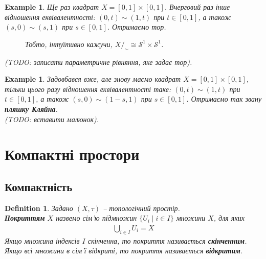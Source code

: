 \documentclass[a4paper, 10pt]{article}
\theoremstyle{theoremdd}
\newtheorem{definition}[theorem]{Definition}
\newtheorem{example}[theorem]{Example}
\begin{document}
\begin{example}
Ще раз квадрат $X = [0,1] \times [0,1]$. Вчерговий раз інше відношення еквівалентності: $(0,t) \sim (1,t)$ при $t \in [0,1]$, а також $(s,0) \sim (s,1)$ при $s \in [0,1]$. Отримаємо тор.
\begin{figure}[H]
\centering
{}
\qquad
{}
\caption*{Тобто, інтуїтивно кажучи, $X/_{\sim} \cong \mathcal{S}^1 \times \mathcal{S}^1$.}
\end{figure}
\noindent
(TODO: записати параметричне рівняння, яке задає тор).
\end{example}

\begin{example}
Задовбався вже, але знову маємо квадрат $X = [0,1] \times [0,1]$, тільки цього разу відношення еквівалентності таке: $(0,t) \sim (1,t)$ при $t \in [0,1]$, а також $(s,0) \sim (1-s,1)$ при $s \in [0,1]$. Отримаємо так звану \textbf{пляшку Кляйна}.\\
(TODO: вставити малюнок).
\end{example}
\newpage

\section{Компактні простори}
\subsection{Компактність}
\begin{definition}
Задано $(X,\tau)$ -- топологічний простір.\\
\textbf{Покриттям} $X$ назвемо сім'ю підмножин $\{U_i \mid i \in I\}$ множини $X$, для яких
\begin{align*}
\bigcup_{i \in I} U_i = X
\end{align*}
Якщо множина індексів $I$ скінченна, то покриття називається \textbf{скінченним}. Якщо всі множини в сім'ї відкриті, то покриття називається \textbf{відкритим}.
\end{definition}
\end{document}
